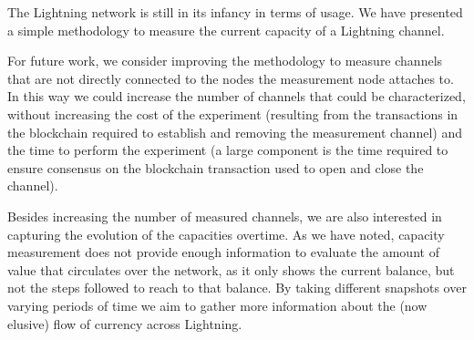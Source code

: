 The Lightning network is still in its infancy in terms of usage. 
We have presented a simple methodology to measure the current capacity of a Lightning channel. 

For future work, we consider improving the methodology to measure channels that are not directly connected to the nodes the measurement node attaches to. In this way we could increase the number of channels that could be characterized, without increasing the cost of the experiment (resulting from the transactions in the blockchain required to establish and removing the measurement channel) and the time to perform the experiment (a large component is the time required to ensure consensus on the blockchain transaction used to open and close the channel). 

Besides increasing the number of measured channels, we are also interested in capturing the evolution of the capacities overtime. 
As we have noted, capacity measurement does not provide enough information to evaluate the amount of value that circulates over the network, as it only shows the current balance, but not the steps followed to reach to that balance.
By taking different snapshots over varying periods of time we aim to gather more information about the (now elusive) flow of currency across Lightning.